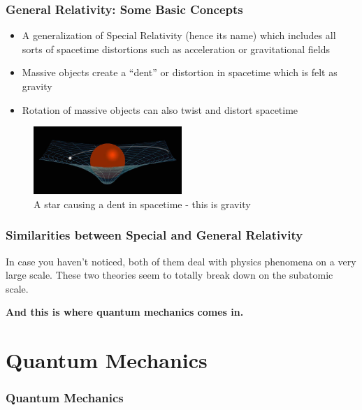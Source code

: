 \documentclass{beamer}
\begin{document}
\begin{frame}
\frametitle{General Relativity: Some Basic Concepts}

\begin{itemize}
\item A generalization of Special Relativity (hence its name) which includes all sorts of spacetime distortions such as acceleration or gravitational fields
\item Massive objects create a ``dent'' or distortion in spacetime which is felt as gravity
\item Rotation of massive objects can also twist and distort spacetime
\end{itemize}

\begin{figure}
\includegraphics[width=0.5\textwidth]{Gravity.jpg}
\caption{\label{fig:gravity}A star causing a dent in spacetime - this is gravity}
\end{figure}

\end{frame}

\begin{frame}
\frametitle{Similarities between Special and General Relativity}

In case you haven't noticed, both of them deal with physics phenomena on a very large scale. These two theories seem to totally break down on the subatomic scale.

\bf{And this is where quantum mechanics comes in.}

\end{frame}

\section{Quantum Mechanics}

\begin{frame}
\frametitle{Quantum Mechanics}
\end{frame}
\end{document}
